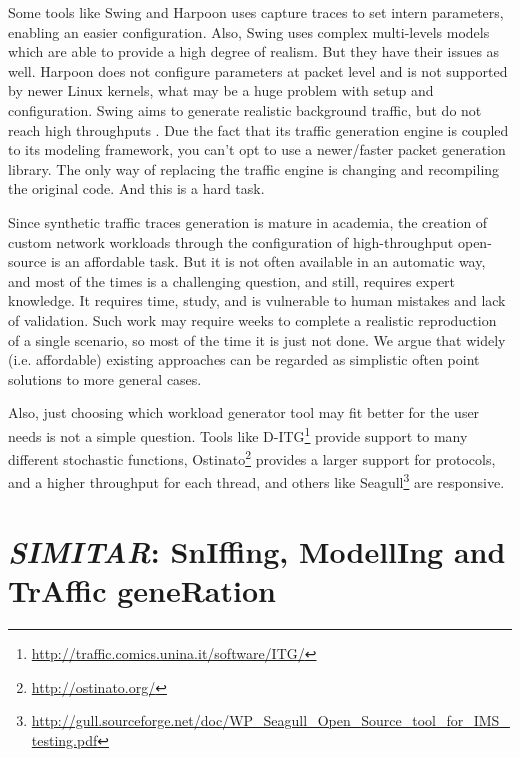 Some tools like Swing and Harpoon uses capture traces to set intern parameters, enabling an easier configuration. Also, Swing uses complex multi-levels models which are able to provide a high degree of realism\cite{swing-paper}. But they have their issues as well. Harpoon does not configure parameters at packet level\cite{harpoon-paper} and is not supported by newer Linux kernels, what may be a huge problem with setup and configuration. Swing\cite{swing-paper} aims to generate realistic background traffic, but do not reach high throughputs \cite{swing-paper} \cite{legotg-paper}. Due the fact that its traffic generation engine is coupled to its modeling framework, you can't opt to use a newer/faster packet generation library. The only way of replacing the traffic engine is changing and recompiling the original code. And this is a hard task.


Since synthetic traffic traces generation is mature in academia, the creation of custom network workloads through the configuration of high-throughput open-source is an affordable task. But it is not often available in an automatic way, and most of the times is a challenging question\cite{legotg-paper}, and still, requires expert knowledge. It requires time, study, and is vulnerable to human mistakes and lack of validation. Such work may require weeks to complete a realistic reproduction of a single scenario, so most of the time it is just not done. We argue that widely (i.e. affordable) existing approaches can be regarded as simplistic often point solutions to more general cases. 


Also, just choosing which workload generator tool may fit better for the user needs is not a simple question. Tools like D-ITG\footnote{\href{http://traffic.comics.unina.it/software/ITG/}{http://traffic.comics.unina.it/software/ITG/}} provide support to many different stochastic functions, Ostinato\footnote{\href{http://ostinato.org/}{http://ostinato.org/}} provides a larger support for protocols, and a higher throughput for each thread\cite{comparative-trafficgen-tools}, and others like Seagull\footnote{\href{http://gull.sourceforge.net/doc/WP_Seagull_Open_Source_tool_for_IMS_testing.pdf}{http://gull.sourceforge.net/doc/WP\_Seagull\_Open\_Source\_tool\_for\_IMS\_testing.pdf}} are responsive. 


\section{\textit{SIMITAR}: SnIffing, ModellIng and TrAffic geneRation}

